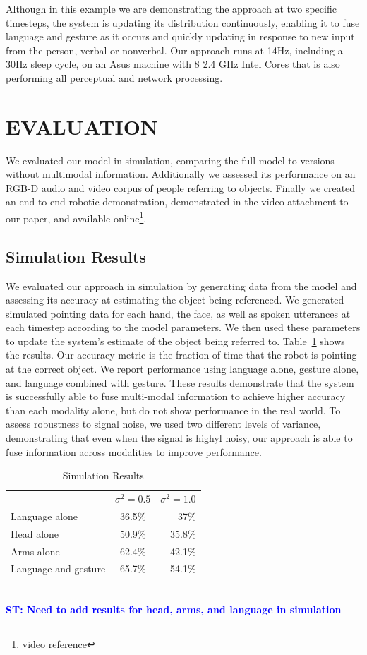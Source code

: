 \documentclass[letterpaper, 10 pt, conference]{ieeeconf}
\newcommand{\stnote}[1]{\textcolor{Blue}{\textbf{ST: #1}}}
\begin{document}
Although in this example we are demonstrating the approach at two
specific timesteps, the system is updating its distribution
continuously, enabling it to fuse language and gesture as it occurs
and quickly updating in response to new input from the person, verbal
or nonverbal.  Our approach runs at 14Hz, including a 30Hz sleep
cycle, on an Asus machine with 8 2.4 GHz Intel Cores that is also
performing all perceptual and network processing. 

\section{EVALUATION}

We evaluated our model in simulation, comparing the full model to
versions without multimodal information.  Additionally we assessed its
performance on an RGB-D audio and video corpus of people referring to
objects.  Finally we created an end-to-end robotic demonstration,
demonstrated in the video attachment to our paper, and available
online\footnote{video reference}.

\subsection{Simulation Results}

We evaluated our approach in simulation by generating data from the
model and assessing its accuracy at estimating the object being
referenced.  We generated simulated pointing data for each hand, the
face, as well as spoken utterances at each timestep according to the
model parameters.  We then used these parameters to update the
system's estimate of the object being referred to.
Table~\ref{table:sim_results} shows the results.  Our accuracy metric
is the fraction of time that the robot is pointing at the correct
object.  We report performance using language alone, gesture alone,
and language combined with gesture.  These results demonstrate that
the system is successfully able to fuse multi-modal information to
achieve higher accuracy than each modality alone, but do not show
performance in the real world.  To assess robustness to signal noise,
we used two different levels of variance, demonstrating that even when
the signal is highyl noisy, our approach is able to fuse information
across modalities to improve performance.

\begin{table}
\centering
\caption{Simulation Results\label{table:sim_results}}
\begin{tabular}{lcr}
\toprule
& $\sigma^2 = 0.5$ & $\sigma^2 = 1.0$\\
Language alone &  36.5\% & 37\%\\
Head alone & 50.9\% & 35.8\%\\
Arms alone & 62.4\% & 42.1\%\\
Language and gesture &  65.7\% & 54.1\%\\
\bottomrule
\end{tabular}
\\
\stnote{Need to add results for head, arms, and language in simulation}
\end{table}
\end{document}

